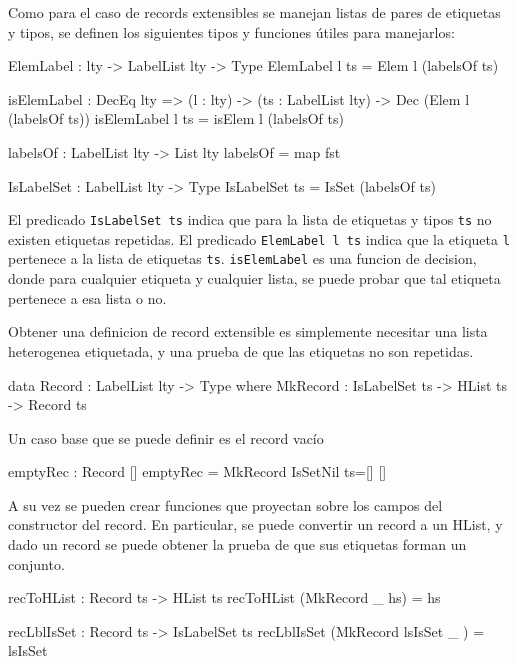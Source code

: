 Como para el caso de records extensibles se manejan listas de pares de etiquetas y tipos, se definen los siguientes tipos y funciones útiles para manejarlos:

\begin{code}
ElemLabel : lty -> LabelList lty -> Type
ElemLabel l ts = Elem l (labelsOf ts)

isElemLabel : DecEq lty => (l : lty) -> 
  (ts : LabelList lty) -> 
  Dec (Elem l (labelsOf ts))
isElemLabel l ts = isElem l (labelsOf ts)

labelsOf : LabelList lty -> List lty
labelsOf = map fst

IsLabelSet : LabelList lty -> Type
IsLabelSet ts = IsSet (labelsOf ts)  
\end{code}

El predicado \texttt{IsLabelSet ts} indica que para la lista de etiquetas y tipos \texttt{ts} no existen etiquetas repetidas.
El predicado \texttt{ElemLabel l ts} indica que la etiqueta \texttt{l} pertenece a la lista de etiquetas \texttt{ts}.
\texttt{isElemLabel} es una funcion de decision, donde para cualquier etiqueta y cualquier lista, se puede probar que tal etiqueta pertenece a esa lista o no.

Obtener una definicion de record extensible es simplemente necesitar una lista heterogenea etiquetada, y una prueba de que las etiquetas no son repetidas.

\begin{code}
data Record : LabelList lty -> Type where
    MkRecord : IsLabelSet ts -> HList ts -> Record ts
\end{code}

Un caso base que se puede definir es el record vacío

\begin{code}
emptyRec : Record []
emptyRec = MkRecord IsSetNil {ts=[]} [] 
\end{code}

A su vez se pueden crear funciones que proyectan sobre los campos del constructor del record. En particular, se puede convertir un record a un HList, y dado un record se puede obtener la prueba de que sus etiquetas forman un conjunto.

\begin{code}
recToHList : Record ts -> HList ts
recToHList (MkRecord _ hs) = hs

recLblIsSet : Record ts -> IsLabelSet ts
recLblIsSet (MkRecord lsIsSet _ ) = lsIsSet  
\end{code}

